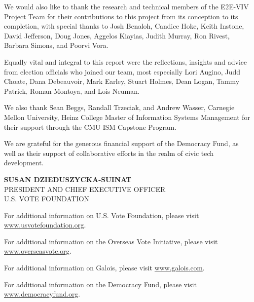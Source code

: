 We would also like to thank the research and technical members of the
E2E-VIV Project Team for their contributions to this project from its 
conception to its completion, with special thanks to Josh Benaloh,
Candice Hoke, Keith Instone, David Jefferson, Doug Jones, Aggelos
Kiayias, Judith Murray, Ron Rivest, Barbara Simons, and Poorvi Vora. 

Equally vital and integral to this report were the reflections,
insights and advice from election officials who joined our team, most
especially Lori Augino, Judd Choate, Dana Debeauvoir, Mark Earley,
Stuart Holmes, Dean Logan, Tammy Patrick, Roman Montoya, and Lois
Neuman.

We also thank Sean Beggs, Randall Trzeciak, and Andrew Wasser,
Carnegie Mellon University, Heinz College Master of Information
Systems Management for their support through the CMU ISM Capstone
Program. 

We are grateful for the generous financial support of the Democracy
Fund, as well as their support of collaborative efforts in the realm
of civic tech development. 

\begin{flushright}
\textbf{SUSAN DZIEDUSZYCKA-SUINAT} \\
PRESIDENT AND CHIEF EXECUTIVE OFFICER \\
U.S. VOTE FOUNDATION
\end{flushright}

\vspace{\fill}

For additional information on U.S. Vote Foundation, please visit
\url{www.usvotefoundation.org}.   

For additional information on the Overseas Vote Initiative, please
visit \url{www.overseasvote.org}. 

For additional information on Galois, please visit
\url{www.galois.com}.

For additional information on the Democracy Fund, please visit
\url{www.democracyfund.org}.  